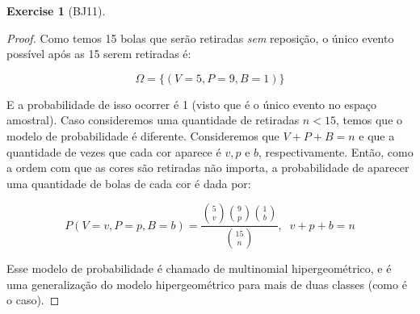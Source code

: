 \documentclass[
]{article}
\theoremstyle{definition}
\theoremstyle{definition}
\theoremstyle{definition}
\newtheorem{exercise}{Exercise}[section]
\theoremstyle{definition}
\theoremstyle{remark}
\begin{document}
\begin{exercise}[BJ11]
\begin{proof}
Como temos 15 bolas que serão retiradas \emph{sem} reposição, o único evento possível após as 15 serem retiradas é:

\begin{equation*}
\Omega = \{(V=5,P=9,B=1)\}
\end{equation*}

E a probabilidade de isso ocorrer é 1 (visto que é o único evento no espaço amostral). Caso consideremos uma quantidade de retiradas \(n < 15\), temos que o modelo de probabilidade é diferente. Consideremos que \(V + P + B = n\) e que a quantidade de vezes que cada cor aparece é \(v,p\) e \(b\), respectivamente. Então, como a ordem com que as cores são retiradas não importa, a probabilidade de aparecer uma quantidade de bolas de cada cor é dada por:

\begin{equation*}
P(V=v,P=p,B=b) = \frac{\binom{5}{v}\binom{9}{p}\binom{1}{b}}{\binom{15}{n}}, \;\; v+p+b = n
\end{equation*}

Esse modelo de probabilidade é chamado de multinomial hipergeométrico, e é uma generalização do modelo hipergeométrico para mais de duas classes (como é o caso).
\end{proof}

\end{exercise}
\end{document}
